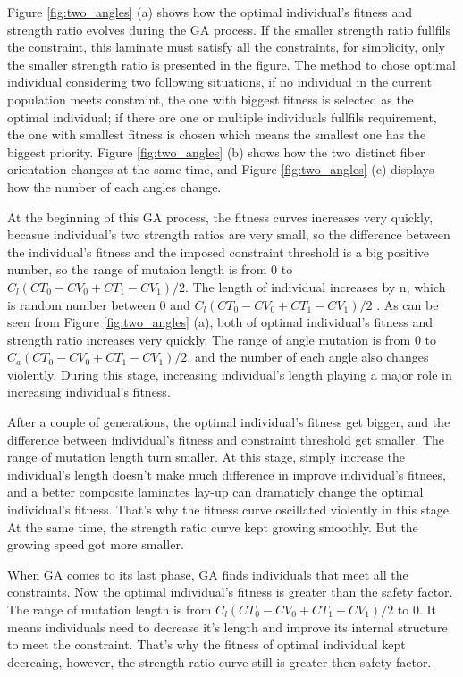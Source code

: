 Figure \ref{fig:two_angles} (a) shows how the optimal individual's fitness and
strength ratio evolves during the GA process. If the smaller strength ratio
fullfils the constraint, this laminate must satisfy all the constraints, for
simplicity, only the smaller strength ratio is presented in the figure. The
method to chose optimal individual considering two following situations, if no
individual in the current population meets constraint, the one with biggest
fitness is selected as the optimal individual; if there are one or multiple
individuals fullfils requirement, the one with smallest fitness is chosen which
means the smallest one has the biggest priority.  Figure \ref{fig:two_angles}
(b) shows how the two distinct fiber orientation changes at the same time, and
Figure \ref{fig:two_angles} (c) displays how the number of each angles change.

At the beginning of this GA process, the fitness curves increases very quickly,
becasue individual's two strength ratios are very small, so the difference
between the individual's fitness and the imposed constraint threshold is a big
positive number, so the range of mutaion length is from 0 to $C_l(CT_0 - CV_0 +
CT_1 - CV_1)/2$.  The length of individual increases by n, which is random
number between 0 and $C_l(CT_0 - CV_0 + CT_1 - CV_1)/2$ . As can be seen from
Figure \ref{fig:two_angles} (a), both of optimal individual's fitness and
strength ratio increases very quickly.  The range of angle mutation is from 0 to
$C_a(CT_0 - CV_0 + CT_1 - CV_1)/2$, and the number of each angle also changes
violently. During this stage, increasing individual's length playing a major
role in increasing individual's fitness.

After a couple of generations, the optimal individual's fitness get bigger, and
the difference between individual's fitness and constraint threshold get
smaller. The range of mutation length turn smaller. At
this stage, simply increase the individual's length doesn't make much difference
in improve individual's fitnees, and a better composite laminates lay-up can
dramaticly change the optimal individual's fitness. That's why the fitness curve
oscillated violently in this stage.  At the same time, the strength ratio curve
kept growing smoothly. But the growing speed got more smaller.

When GA comes to its last phase, GA finds individuals that meet all the
constraints.  Now the optimal individual's fitness is greater than the safety
factor. The range of mutation length is from $C_l(CT_0 - CV_0 + CT_1 - CV_1)/2$
to 0. It means individuals need to decrease it's length and improve its internal
structure to meet the constraint. That's why the fitness of optimal individual
kept decreaing, however, the strength ratio curve still is greater then safety
factor.

